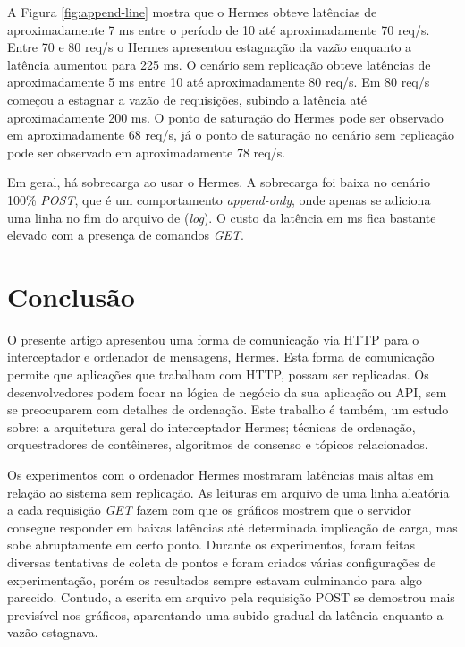 \documentclass[12pt]{article}
\begin{document}
A Figura \ref{fig:append-line} mostra que o Hermes obteve latências de aproximadamente 7 ms entre o período de 10 até aproximadamente 70 req/s. Entre 70 e 80 req/s o Hermes apresentou estagnação da vazão enquanto a latência aumentou para 225 ms. O cenário sem replicação obteve latências de aproximadamente 5 ms entre 10 até aproximadamente 80 req/s. Em 80 req/s começou a estagnar a vazão de requisições, subindo a latência até aproximadamente 200 ms. O ponto de saturação do Hermes pode ser observado em aproximadamente 68 req/s, já o ponto de saturação no cenário sem replicação pode ser observado em aproximadamente 78 req/s.

Em geral, há sobrecarga ao usar o Hermes. A sobrecarga foi baixa no cenário 100\% \textit{POST}, que é um comportamento \textit{append-only}, onde apenas se adiciona uma linha no fim do arquivo de (\textit{log}). O custo da latência em ms fica bastante elevado com a presença de comandos \textit{GET}.

\section{Conclusão}

O presente artigo apresentou uma forma de comunicação via HTTP para o interceptador e ordenador de mensagens, Hermes. Esta forma de comunicação permite que aplicações que trabalham com HTTP, possam ser replicadas. Os desenvolvedores podem focar na lógica de negócio da sua aplicação ou {API}, sem se preocuparem com detalhes de ordenação. Este trabalho é também, um estudo sobre: a arquitetura geral do interceptador Hermes; técnicas de ordenação, orquestradores de contêineres, algoritmos de consenso e tópicos relacionados.

Os experimentos com o ordenador Hermes mostraram latências mais altas em relação ao sistema sem replicação. As leituras em arquivo de uma linha aleatória a cada requisição \textit{GET} fazem com que os gráficos mostrem que o servidor consegue responder em baixas latências até determinada implicação de carga, mas sobe abruptamente em certo ponto. Durante os experimentos, foram feitas diversas tentativas de coleta de pontos e foram criados várias configurações de experimentação, porém os resultados sempre estavam culminando para algo parecido. Contudo, a escrita em arquivo pela requisição POST se demostrou mais previsível nos gráficos, aparentando uma subido gradual da latência enquanto a vazão estagnava.



\end{document}
